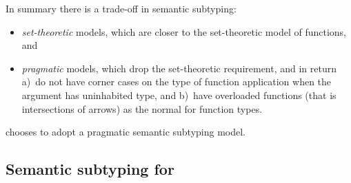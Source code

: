 \documentclass[acmsmall,review,screen]{acmart}
\begin{document}
In summary there is a trade-off in semantic subtyping:
\begin{itemize}
  
\item \emph{set-theoretic} models, which are closer to the set-theoretic model
  of functions, and

\item \emph{pragmatic} models, which drop the set-theoretic requirement, and in return
  a)~do not have corner cases on the type of function application when the argument has uninhabited type, and
  b)~have overloaded functions (that is intersections of arrows) as the normal for function types.
  
\end{itemize}
 chooses to adopt a pragmatic semantic subtyping model.

\subsection{Semantic subtyping for }
\end{document}
